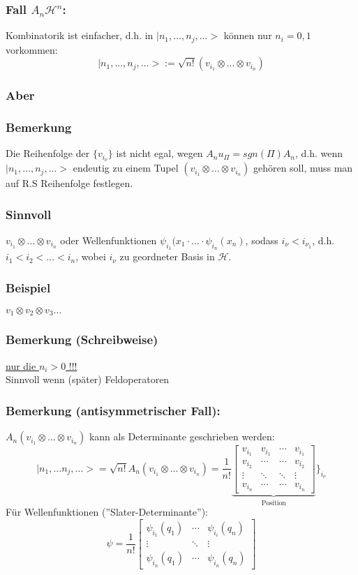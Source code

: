 \documentclass[twoside,a4paper]{scrartcl}
\renewcommand{\1}{\mathds{1}}
\renewcommand{\H}{\mathcal{H}}
\begin{document}
\subsubsection*{Fall $A_n\H^n$:}
Kombinatorik ist einfacher, d.h. in  $|n_1,...,n_j,...>$ können nur $n_i=0,1$ vorkommen:
$$|n_1,...,n_j,...>:=\sqrt{n!}(v_{i_1}\otimes ... \otimes v_{i_n})$$
\subsubsection*{Aber}
\subsubsection*{Bemerkung}
Die Reihenfolge der $\{v_{i_\nu}\}$ ist nicht egal, wegen $A_n u_\Pi=sgn(\Pi) A_n$, d.h. wenn $|n_1,...,n_j,...>$ endeutig zu einem Tupel $(v_{i_1}\otimes ... \otimes v_{i_n})$ gehören soll, muss man auf R.S Reihenfolge festlegen.
\subsubsection*{Sinnvoll}
$v_{i_1}\otimes ... \otimes v_{i_n}$ oder Wellenfunktionen $\psi_{i_1}(x_1\cdot ... \cdot \psi_{i_n}(x_n)$, sodass $i_\nu< i_{\nu_1}$, d.h. $i_1<i_2<...<i_n$, wobei $i_\nu$ zu geordneter Basis in $\H$.
\subsubsection*{Beispiel}
$v_1\otimes v_2 \otimes v_3 ...$
\subsubsection*{Bemerkung (Schreibweise)}
\underline{nur die $n_i>0$ !!!}\\
Sinnvoll wenn (später) Feldoperatoren
\subsubsection*{Bemerkung (antisymmetrischer Fall):}
$A_n(v_{i_1}\otimes ... \otimes v_{i_n})$ kann als Determinante geschrieben werden:
$$|n_1,...n_j,...>=\sqrt{n!} A_n(v_{i_1}\otimes ... \otimes v_{i_n})=\frac{1}{n!} \underbrace{\begin{bmatrix} v_{i_1} & v_{i_1} & \cdots &v_{i_1}\\ v_{i_2} & \cdots & \cdots &v_{i_2} \\ \vdots & \ddots & \ddots & \vdots \\ v_{i_n} & \cdots & \cdots &v_{i_n} \end{bmatrix}}_{\mathrm{Position}}\rbrace_{i_\nu}$$
Für Wellenfunktionen (''Slater-Determinante''):
$$\psi=\frac{1}{n!} \begin{bmatrix} \psi_{i_1}(q_1) & \cdots &\psi_{i_i}(q_n)\\ \vdots & \ddots & \vdots \\ \psi_{i_n}(q_1) & \cdots & \psi_{i_n}(q_n) \end{bmatrix}$$
\end{document}
